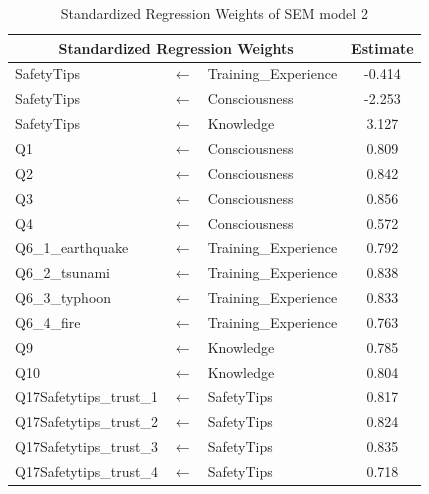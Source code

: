 \begin{table}[h]
  \caption{Standardized Regression Weights of SEM model 2 }
  \label{table12}
  \centering
  \begin{tabular}{lcl|c}
 \hline
 \multicolumn{3}{c|}{Standardized Regression Weights} & Estimate  \\
 \hline
SafetyTips              &$\longleftarrow$ & Training\_Experience & -0.414 \\
SafetyTips              &$\longleftarrow$ & Consciousness        & -2.253 \\
SafetyTips              &$\longleftarrow$ & Knowledge            & 3.127  \\
Q1                      &$\longleftarrow$ & Consciousness        & 0.809  \\
Q2                      &$\longleftarrow$ & Consciousness        & 0.842  \\
Q3                      &$\longleftarrow$ & Consciousness        & 0.856  \\
Q4                      &$\longleftarrow$ & Consciousness        & 0.572  \\
Q6\_1\_earthquake       &$\longleftarrow$ & Training\_Experience & 0.792  \\
Q6\_2\_tsunami          &$\longleftarrow$ & Training\_Experience & 0.838  \\
Q6\_3\_typhoon          &$\longleftarrow$ & Training\_Experience & 0.833  \\
Q6\_4\_fire             &$\longleftarrow$ & Training\_Experience & 0.763  \\
Q9                      &$\longleftarrow$ & Knowledge            & 0.785  \\
Q10                     &$\longleftarrow$ & Knowledge            & 0.804  \\
Q17Safetytips\_trust\_1 &$\longleftarrow$ & SafetyTips           & 0.817  \\
Q17Safetytips\_trust\_2 &$\longleftarrow$ & SafetyTips           & 0.824  \\
Q17Safetytips\_trust\_3 &$\longleftarrow$ & SafetyTips           & 0.835  \\
Q17Safetytips\_trust\_4 &$\longleftarrow$ & SafetyTips           & 0.718  \\
 \hline
  \end{tabular}
\end{table}

